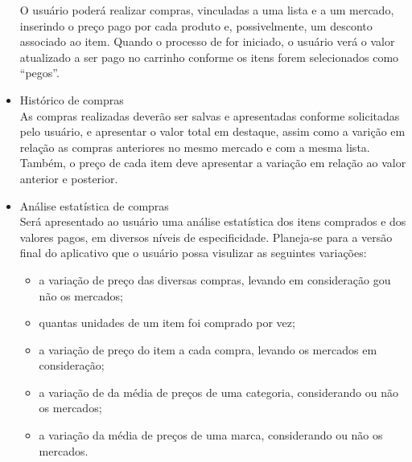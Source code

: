 \begin{itemize}
  O usuário poderá realizar compras, vinculadas a uma lista e a um
  mercado, inserindo o preço pago por cada produto e, possivelmente,
  um desconto associado ao item. Quando o processo de for iniciado, o
  usuário verá o valor atualizado a ser pago no carrinho conforme os
  itens forem selecionados como ``pegos''.
\item Histórico de compras\\
  As compras realizadas deverão ser salvas e apresentadas conforme
  solicitadas pelo usuário, e apresentar o valor total em destaque,
  assim como a varição em relação as compras anteriores no mesmo
  mercado e com a mesma lista. Também, o preço de cada item deve
  apresentar a variação em relação ao valor anterior e posterior.
\item Análise estatística de compras\\
  Será apresentado ao usuário uma análise estatística dos itens
  comprados e dos valores pagos, em diversos níveis de
  especificidade. Planeja-se para a versão final do aplicativo que o
  usuário possa visulizar as seguintes variações:
  \begin{itemize}
  \item a variação de preço das diversas compras, levando em
    consideração gou não os mercados;
  \item quantas unidades de um item foi comprado por vez;
  \item a variação de preço do item a cada compra, levando os mercados
    em consideração;
  \item a variação de da média de preços de uma categoria,
    considerando ou não os mercados;
  \item a variação da média de preços de uma marca, considerando ou
    não os mercados.
  \end{itemize}
\end{itemize}

